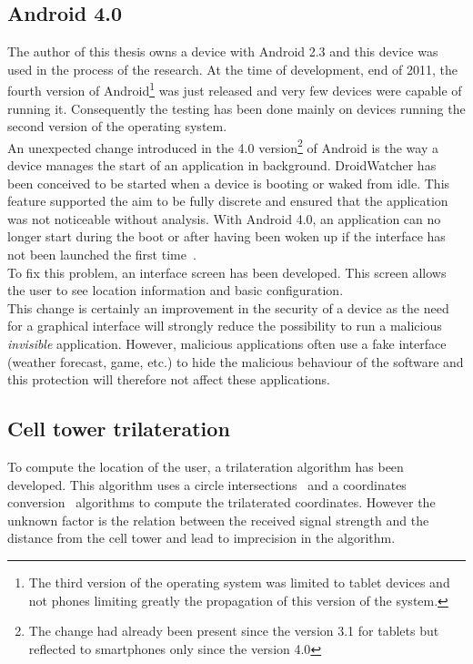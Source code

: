 \subsection{Android 4.0}
\label{sec:dw-ics}

The author of this thesis owns a device with Android 2.3 and this device was used in the process of the research. 
At the time of development, end of 2011, the fourth version of Android\footnote{The third version of the operating system was limited to tablet devices and not phones limiting greatly the propagation of this version of the system.} was just released and very few devices were capable of running it.
Consequently the testing has been done mainly on devices running the second version of the operating system.\\

An unexpected change introduced in the 4.0 version\footnote{The change had already been present since the version 3.1 for tablets but reflected to smartphones only since the version 4.0} of Android is the way a device manages the start of an application in background.
DroidWatcher has been conceived to be started when a device is booting or waked from idle.
This feature supported the aim to be fully discrete and ensured that the application was not noticeable without analysis.
With Android 4.0, an application can no longer start during the boot or after having been woken up if the interface has not been launched the first time~\cite{boot-restrictions}.\\

To fix this problem, an interface screen has been developed.
This screen allows the user to see location information and basic configuration.\\

This change is certainly an improvement in the security of a device as the need for a graphical interface will strongly reduce the possibility to run a malicious \emph{invisible} application.
However, malicious applications often use a fake interface (weather forecast, game, etc.) to hide the malicious behaviour of the software and this protection will therefore not affect these applications.

\subsection{Cell tower trilateration}
\label{sec:dw-difficult-cell}

To compute the location of the user, a trilateration algorithm has been developed.
This algorithm uses a circle intersections~\cite{circle-inter} and a coordinates conversion~\cite{ibm-coordinates} algorithms to compute the trilaterated coordinates.
However the unknown factor is the relation between the received signal strength and the distance from the cell tower and lead to imprecision in the algorithm.\\

